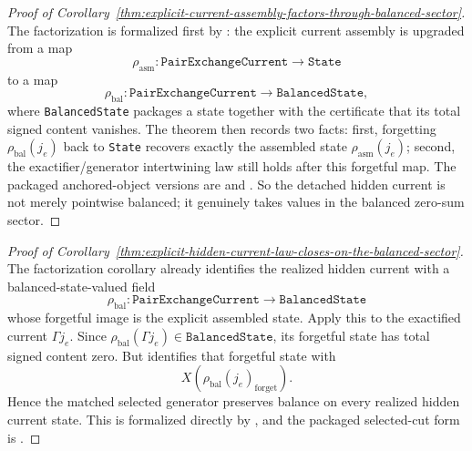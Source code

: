 \begin{proof}[Proof of Corollary~\ref{thm:explicit-current-assembly-factors-through-balanced-sector}]
\label{proof:thm:explicit-current-assembly-factors-through-balanced-sector}
The factorization is formalized first by
: the explicit current
assembly is upgraded from a map
\[
\rho_{\mathrm{asm}} : \texttt{PairExchangeCurrent}\to\texttt{State}
\]
to a map
\[
\rho_{\mathrm{bal}} : \texttt{PairExchangeCurrent}\to\texttt{BalancedState},
\]
where \texttt{BalancedState} packages a state together with the certificate that
its total signed content vanishes. The theorem
 then records two
facts: first, forgetting \(\rho_{\mathrm{bal}}(j_e)\) back to
\texttt{State} recovers exactly the assembled state \(\rho_{\mathrm{asm}}(j_e)\);
second, the exactifier/generator intertwining law still holds after this
forgetful map. The packaged anchored-object versions are
and
.
So the detached hidden current is not merely pointwise balanced; it genuinely
takes values in the balanced zero-sum sector.
\end{proof}

\begin{proof}[Proof of Corollary~\ref{thm:explicit-hidden-current-law-closes-on-the-balanced-sector}]
\label{proof:thm:explicit-hidden-current-law-closes-on-the-balanced-sector}
The factorization corollary already identifies the realized hidden current with
a balanced-state-valued field
\[
\rho_{\mathrm{bal}} : \texttt{PairExchangeCurrent}\to\texttt{BalancedState}
\]
whose forgetful image is the explicit assembled state. Apply this to the
exactified current \(\Gamma j_e\). Since
\(\rho_{\mathrm{bal}}(\Gamma j_e)\in\texttt{BalancedState}\), its forgetful
state has total signed content zero. But
 identifies that
forgetful state with
\[
X(\rho_{\mathrm{bal}}(j_e)_{\mathrm{forget}}).
\]
Hence the matched selected generator preserves balance on every realized hidden
current state. This is formalized directly by
, and the
packaged selected-cut form is
.
\end{proof}

